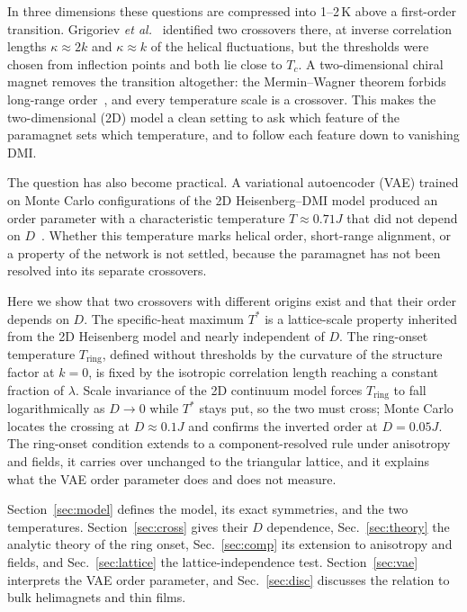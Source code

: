 \documentclass[prb,reprint,longbibliography,superscriptaddress,amsmath,amssymb]{revtex4-2}
\newcommand{\Ts}{T^{*}}
\newcommand{\Tr}{T_{\mathrm{ring}}}
\begin{document}
In three dimensions these questions are compressed into 1--2\,K above a first-order transition. Grigoriev \textit{et al.}~\cite{Grigoriev2011} identified two crossovers there, at inverse correlation lengths $\kappa\approx2k$ and $\kappa\approx k$ of the helical fluctuations, but the thresholds were chosen from inflection points and both lie close to $T_c$. A two-dimensional chiral magnet removes the transition altogether: the Mermin--Wagner theorem forbids long-range order~\cite{TODO-MerminWagner1966}, and every temperature scale is a crossover. This makes the two-dimensional (2D) model a clean setting to ask which feature of the paramagnet sets which temperature, and to follow each feature down to vanishing DMI.

The question has also become practical. A variational autoencoder (VAE) trained on Monte Carlo configurations of the 2D Heisenberg--DMI model produced an order parameter with a characteristic temperature $T\approx0.71J$ that did not depend on $D$~\cite{Yoon2024}. Whether this temperature marks helical order, short-range alignment, or a property of the network is not settled, because the paramagnet has not been resolved into its separate crossovers.

Here we show that two crossovers with different origins exist and that their order depends on $D$. The specific-heat maximum $\Ts$ is a lattice-scale property inherited from the 2D Heisenberg model and nearly independent of $D$. The ring-onset temperature $\Tr$, defined without thresholds by the curvature of the structure factor at $k=0$, is fixed by the isotropic correlation length reaching a constant fraction of $\lambda$. Scale invariance of the 2D continuum model forces $\Tr$ to fall logarithmically as $D\to0$ while $\Ts$ stays put, so the two must cross; Monte Carlo locates the crossing at $D\approx0.1J$ and confirms the inverted order at $D=0.05J$. The ring-onset condition extends to a component-resolved rule under anisotropy and fields, it carries over unchanged to the triangular lattice, and it explains what the VAE order parameter does and does not measure.

Section~\ref{sec:model} defines the model, its exact symmetries, and the two temperatures. Section~\ref{sec:cross} gives their $D$ dependence, Sec.~\ref{sec:theory} the analytic theory of the ring onset, Sec.~\ref{sec:comp} its extension to anisotropy and fields, and Sec.~\ref{sec:lattice} the lattice-independence test. Section~\ref{sec:vae} interprets the VAE order parameter, and Sec.~\ref{sec:disc} discusses the relation to bulk helimagnets and thin films.
\end{document}
